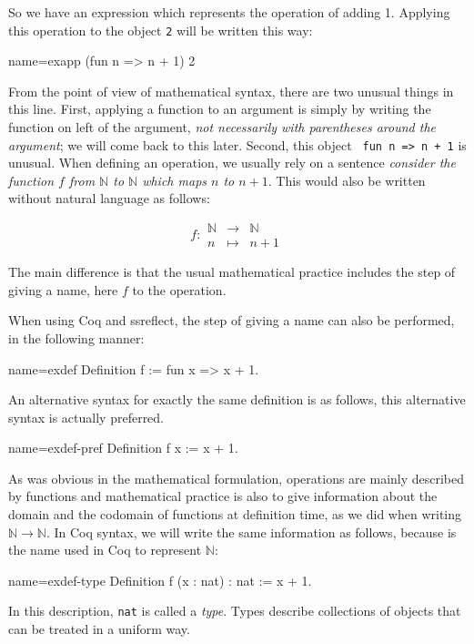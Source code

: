 So we have an expression which represents the operation of adding 1.
Applying this operation to the object {\tt 2} will be written this
way:

\begin{coq}{name=exapp}{}
  (fun n => n + 1) 2
\end{coq}
From the point of view of mathematical syntax, there are two unusual 
things in this line.  First, applying a function to an argument is simply
by writing the function on left of the argument, {\em not necessarily
with parentheses around the argument}; we will come back to this later.
Second, this object {\tt
  fun n => n + 1} is unusual.  When defining an operation, we usually
rely on a sentence {\em consider the function \(f\) from {\(\mathbb{N}\)}
to {\(\mathbb{N}\)} which maps \(n\) to \(n + 1\)}.  This would also be
written without natural language as follows:

\[f : 
\begin{array}{ccc}
{\mathbb{N}} &\rightarrow& {\mathbb{N}}\\
n &\mapsto& n + 1
\end{array}\]

The main difference is that the usual mathematical practice includes
the step of giving a name, here \(f\) to the operation.

When using Coq and ssreflect, the step of giving a name can also be
performed, in the following manner:

\begin{coq}{name=exdef}{}
Definition f := fun x => x + 1.
\end{coq}
An alternative syntax for exactly the same definition is as follows,
this alternative syntax is actually preferred.

\begin{coq}{name=exdef-pref}{}
Definition f x := x + 1.
\end{coq}
As was obvious in the mathematical formulation, operations are mainly
described by functions and mathematical practice is also to give
information about the domain and the codomain of functions at
definition time, as we did when writing
\({\mathbb{N}}\rightarrow{\mathbb{N}}\).  In Coq syntax, we will write
the same information as follows, because  is the name used in
Coq to represent \(\mathbb{N}\):

\begin{coq}{name=exdef-type}{}
Definition f (x : nat) : nat := x + 1.
\end{coq}
In this description, {\tt nat} is called a {\em type}.  Types describe
collections of objects that can be treated in a uniform way.

